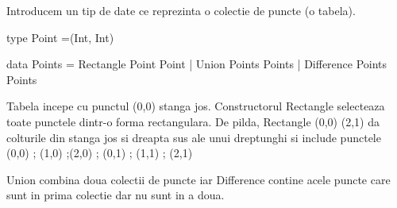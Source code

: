 \documentclass[addpoints,12pt,a4paper]{exam}
\begin{document}
\begin{questions}


\question[2] 
Introducem un tip de date ce reprezinta o colectie de puncte (o tabela). 
\begin{asciihs}
type Point =(Int, Int)

data Points = Rectangle Point Point
            | Union Points Points
            | Difference Points Points 
\end{asciihs}
			  
			  
Tabela incepe cu punctul (0,0) stanga jos. 
Constructorul Rectangle selecteaza toate punctele dintr-o forma rectangulara.
De pilda, Rectangle (0,0) (2,1) da colturile din stanga jos si dreapta sus ale unui dreptunghi si include punctele (0,0) ; (1,0) ;(2,0) ; (0,1) ; (1,1) ; (2,1)

Union combina doua colectii de puncte iar Difference contine acele puncte care sunt in prima colectie dar nu sunt in a doua. 			  



\end{questions}
\end{document}
